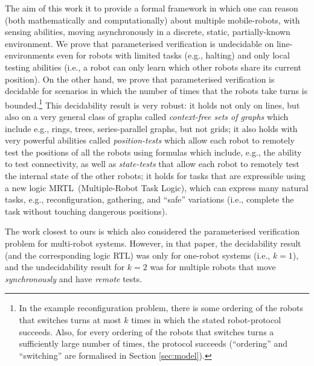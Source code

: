 \documentclass{llncs}
\newcommand{\head}[1]{\vspace{2mm} \noindent  {\bf #1}}
\def\MRTL{\textsf{MRTL}}
\def\RTL{\textsf{RTL}}
\begin{document}
\head{Aims and Contributions.}
The  aim of this work it to provide a formal framework in which one can reason (both mathematically and computationally) about multiple mobile-robots, with sensing abilities, moving asynchronously in a discrete, static, partially-known environment.
%
We prove that parameterised verification is undecidable on line-environments even for robots with limited tasks (e.g., halting) and only local testing abilities (i.e., a robot can only learn which other robots share its current position).
%
On the other hand, we prove that parameterised verification is decidable for scenarios in which the number of times that the robots take turns is bounded.\footnote{In the example reconfiguration problem, there is some ordering of the robots that switches turns at most $k$ times in which the stated robot-protocol succeeds. Also, for every ordering of the robots that switches turns a sufficiently large number of times, the protocol succeeds (``ordering'' and ``switching'' are formalised in Section \ref{sec:model}).}
This decidability result is very robust:
 it holds not only on lines, but also on a very general class of graphs called {\em context-free sets of graphs} which include e.g., rings, trees, series-parallel graphs, but not grids;
it also holds with very powerful abilities called {\em position-tests} which allow each robot to {remotely} test the positions of all the robots using formulas which include, e.g., the ability to test connectivity, as well as {\em state-tests} that allow each robot to {remotely} test the internal state of the other robots;
 it holds for tasks that are expressible using a new logic \MRTL\ (Multiple-Robot Task Logic), which can express many natural tasks, e.g., reconfiguration, gathering, and ``safe'' variations (i.e., complete the task without touching dangerous positions).%

\head{Related Work.}
The work closest to ours is \cite{Rubin15AAMAS} which also considered the parameterised verification problem for multi-robot systems. However, in that paper, the decidability result (and the corresponding logic \RTL) was only for one-robot systems (i.e., $k=1$), and the undecidability result for $k=2$ was for multiple robots that move {\em synchronously} and have {\em remote} tests.
\end{document}

